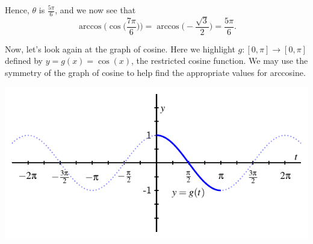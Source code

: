 \documentclass{ximera}
\begin{document}
\begin{example}
\begin{enumerate}
\begin{explanation}
\begin{image}
\end{image}
%
Hence, $\theta$ is $\frac{5\pi}{6}$, and we now see that 
\begin{equation*}
\arccos\Big(\cos\Big(\frac{7\pi}{6}\Big)\Big) = \arccos\Big(\!-\frac{\sqrt{3}}{2}\Big) = \frac{5\pi}{6}.
\end{equation*}

Now, let's look again at the graph of cosine. Here we highlight $g: [0,\pi] \rightarrow [0,\pi]$ defined by $y=g(x)=\cos(x)$, the restricted cosine function. We may use the symmetry of the graph of cosine to help find the appropriate values for arccosine.
\begin{image}
\includegraphics{inverse-trig-PA-cosine.pdf}
\end{image}





\end{explanation}
\end{enumerate}
\end{example}
\end{document}
